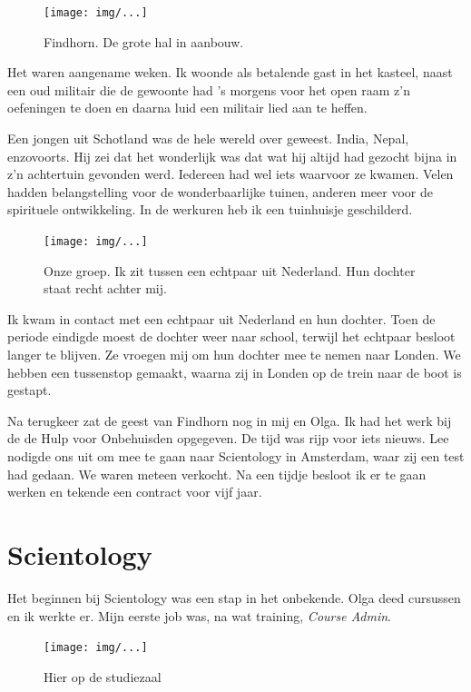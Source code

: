 \documentclass[12pt,twoside]{memoir}
\begin{document}
\begin{figure}[t]
\texttt{[image: img/...]}
\caption{Findhorn. De grote hal in aanbouw.}
\end{figure}

Het waren aangename weken. Ik woonde als betalende gast in het kasteel, naast een oud militair die de gewoonte had ’s morgens voor het open raam z’n oefeningen te doen en daarna luid een militair lied aan te heffen. 

Een jongen uit Schotland was de hele wereld over geweest. India, Nepal, enzovoorts. Hij zei dat het wonderlijk was dat wat hij altijd had gezocht bijna in z’n achtertuin gevonden werd. Iedereen had wel iets waarvoor ze kwamen. Velen hadden belangstelling voor de wonderbaarlijke tuinen, anderen meer voor de spirituele ontwikkeling. In de werkuren heb ik een tuinhuisje geschilderd. 

\begin{figure}[t]
\texttt{[image: img/...]}
\caption{Onze groep. Ik zit tussen een echtpaar uit Nederland. Hun dochter staat recht achter mij.}
\end{figure}

Ik kwam in contact met een echtpaar uit Nederland en hun dochter. Toen de periode eindigde moest de dochter weer naar school, terwijl het echtpaar besloot langer te blijven. Ze vroegen mij om hun dochter mee te nemen naar Londen. We hebben een tussenstop gemaakt, waarna zij in Londen op de trein naar de boot is gestapt.

Na terugkeer zat de geest van Findhorn nog in mij en Olga. Ik had het werk bij de de Hulp voor Onbehuisden opgegeven. De tijd was rijp voor iets nieuws. Lee nodigde ons uit om mee te gaan naar Scientology in Amsterdam, waar zij een test had gedaan. We waren meteen verkocht. Na een tijdje besloot ik er te gaan werken en tekende een contract voor vijf jaar. 

\chapter{Scientology} %
\label{cha:scientologu}

Het beginnen bij Scientology was een stap in het onbekende. Olga deed cursussen en ik werkte er. Mijn eerste job was, na wat training, \emph{Course Admin}. 

\begin{figure}[t]
\texttt{[image: img/...]}
\caption{Hier op de studiezaal}
\end{figure}
\end{document}
